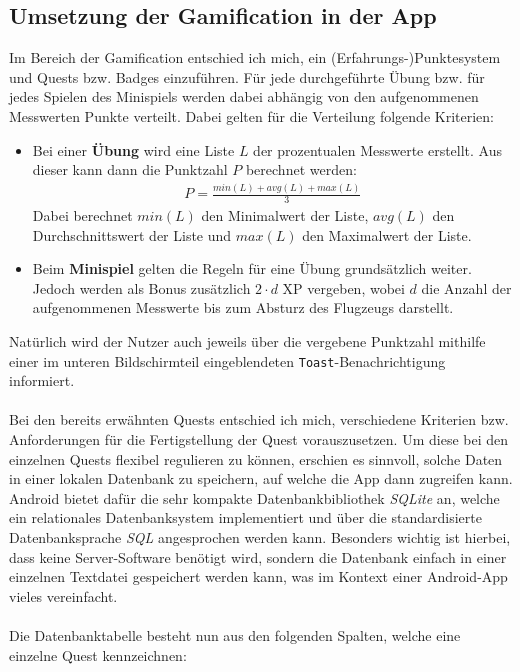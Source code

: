 \subsection{Umsetzung der Gamification in der App}
Im Bereich der Gamification entschied ich mich, ein (Erfahrungs-)Punktesystem und Quests bzw. Badges einzuführen. Für jede durchgeführte Übung bzw. für jedes Spielen des Minispiels werden dabei abhängig von den aufgenommenen Messwerten Punkte verteilt. Dabei gelten für die Verteilung folgende Kriterien:
\begin{itemize}
	\item Bei einer \textbf{Übung} wird eine Liste $L$ der prozentualen Messwerte erstellt. Aus dieser kann dann die Punktzahl $P$ berechnet werden:
	\begin{align*}
	P = \frac{min(L) + avg(L) + max(L)}{3}
	\end{align*}
	Dabei berechnet $min(L)$ den Minimalwert der Liste, $avg(L)$ den Durchschnittswert der Liste und $max(L)$ den Maximalwert der Liste.
	\item Beim \textbf{Minispiel} gelten die Regeln für eine Übung grundsätzlich weiter. Jedoch werden als Bonus zusätzlich $2 \cdot d$ XP vergeben, wobei $d$ die Anzahl der aufgenommenen Messwerte bis zum Absturz des Flugzeugs darstellt.
\end{itemize}
Natürlich wird der Nutzer auch jeweils über die vergebene Punktzahl mithilfe einer im unteren Bildschirmteil eingeblendeten \texttt{Toast}-Benachrichtigung informiert. \\ \\
Bei den bereits erwähnten Quests entschied ich mich, verschiedene Kriterien bzw. Anforderungen für die Fertigstellung der Quest vorauszusetzen. Um diese bei den einzelnen Quests flexibel regulieren zu können, erschien es sinnvoll, solche Daten in einer lokalen Datenbank zu speichern, auf welche die App dann zugreifen kann. Android bietet dafür die sehr kompakte Datenbankbibliothek \textit{SQLite} an, welche ein relationales Datenbanksystem implementiert und über die standardisierte Datenbanksprache \textit{SQL} angesprochen werden kann.\cite{Src:AndroidKuenneth} Besonders wichtig ist hierbei, dass keine Server-Software benötigt wird, sondern die Datenbank einfach in einer einzelnen Textdatei gespeichert werden kann, was im Kontext einer Android-App vieles vereinfacht.\cite{Src:AndroidKuenneth} \\ \\
Die Datenbanktabelle besteht nun aus den folgenden Spalten, welche eine einzelne Quest kennzeichnen:
